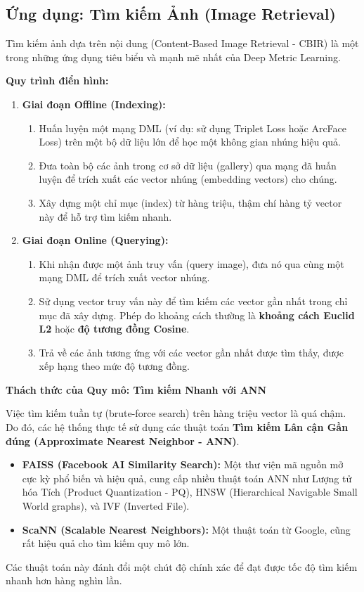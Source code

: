 \subsection{Ứng dụng: Tìm kiếm Ảnh (Image Retrieval)}
\label{subsec:application_image_retrieval}
Tìm kiếm ảnh dựa trên nội dung (Content-Based Image Retrieval - CBIR) là một trong những ứng dụng tiêu biểu và mạnh mẽ nhất của Deep Metric Learning.

\textbf{Quy trình điển hình:}
\begin{enumerate}
	\item \textbf{Giai đoạn Offline (Indexing):}
	\begin{enumerate}
		\item Huấn luyện một mạng DML (ví dụ: sử dụng Triplet Loss hoặc ArcFace Loss) trên một bộ dữ liệu lớn để học một không gian nhúng hiệu quả.
		\item Đưa toàn bộ các ảnh trong cơ sở dữ liệu (gallery) qua mạng đã huấn luyện để trích xuất các vector nhúng (embedding vectors) cho chúng.
		\item Xây dựng một chỉ mục (index) từ hàng triệu, thậm chí hàng tỷ vector này để hỗ trợ tìm kiếm nhanh.
	\end{enumerate}
	\item \textbf{Giai đoạn Online (Querying):}
	\begin{enumerate}
		\item Khi nhận được một ảnh truy vấn (query image), đưa nó qua cùng một mạng DML để trích xuất vector nhúng.
		\item Sử dụng vector truy vấn này để tìm kiếm các vector gần nhất trong chỉ mục đã xây dựng. Phép đo khoảng cách thường là \textbf{khoảng cách Euclid L2} hoặc \textbf{độ tương đồng Cosine}.
		\item Trả về các ảnh tương ứng với các vector gần nhất được tìm thấy, được xếp hạng theo mức độ tương đồng.
	\end{enumerate}
\end{enumerate}

\begin{mdframed}[style=infobox]
	\textbf{Thách thức của Quy mô: Tìm kiếm Nhanh với ANN}
	
	Việc tìm kiếm tuần tự (brute-force search) trên hàng triệu vector là quá chậm. Do đó, các hệ thống thực tế sử dụng các thuật toán \textbf{Tìm kiếm Lân cận Gần đúng (Approximate Nearest Neighbor - ANN)}.
	\begin{itemize}
		\item \textbf{FAISS (Facebook AI Similarity Search):} Một thư viện mã nguồn mở cực kỳ phổ biến và hiệu quả, cung cấp nhiều thuật toán ANN như Lượng tử hóa Tích (Product Quantization - PQ), HNSW (Hierarchical Navigable Small World graphs), và IVF (Inverted File).
		\item \textbf{ScaNN (Scalable Nearest Neighbors):} Một thuật toán từ Google, cũng rất hiệu quả cho tìm kiếm quy mô lớn.
	\end{itemize}
	Các thuật toán này đánh đổi một chút độ chính xác để đạt được tốc độ tìm kiếm nhanh hơn hàng nghìn lần.
\end{mdframed}

